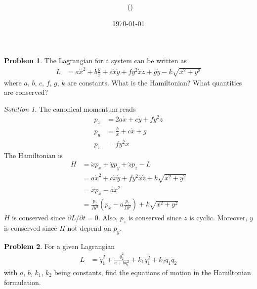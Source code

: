 \documentclass[twoside,11pt]{article}
\title{{\lms \Code \ \Ass}}
\author{\lms \name \ (\href{mailto:\mail}{\mail})}
\date{\sffamily \today}
\makeatletter
\newcommand{\lms}{\fontfamily{lmss}\selectfont} %
\theoremstyle{definition}
\newtheorem{problem}{\lms Problem}
\theoremstyle{remark}
\newtheorem*{solution}{Solution}
\renewcommand{\maketitle}{\bgroup\setlength{\parindent}{0pt}
\begin{flushleft}
  \textbf{\Large\@title}

  \@author
\end{flushleft}\egroup
}
\makeatother
\begin{document}
\maketitle
\thispagestyle{title}

\begin{problem}
The Lagrangian for a system can be written as
\begin{align}
    L &= a\dot x^2 + b \frac{\dot y}{x} + c\dot x\dot y
    + fy^2\dot x\dot z + g\dot y - k\sqrt{x^2 + y^2}
\end{align}
where $a$, $b$, $c$, $f$, $g$, $k$ are constants.
What is the Hamiltonian?
What quantities are conserved?
\end{problem}

\begin{solution}
The canonical momentum reads
\begin{align*}
    p_x &= 2a\dot x + c\dot y + fy^2\dot z\\
    p_y &= \frac{b}{x} + c\dot x + g\\
    p_z &= fy^2 x
\end{align*}
The Hamiltonian is 
\begin{align*}
    H &= \dot xp_x + \dot yp_y + \dot zp_z - L\\
      &= a\dot x^2 + c\dot x\dot y + fy^2\dot x\dot z + k\sqrt{x^2 + y^2}\\
      &= \dot xp_x - a\dot x^2\\
      &= \frac{p_z}{fy^2}\left( 
          p_x - a \frac{p_z}{fy^2}
      \right) + k\sqrt{x^2 + y^2}
\end{align*}
$H$ is conserved since $\partial L/\partial t = 0$.
Also, $p_z$ is conserved since $z$ is cyclic.
Moreover, $y$ is conserved since $H$ not depend on $p_y$.
\end{solution}



\begin{problem}
For a given Lagrangian
\begin{align}
    L &= \dot q_1^2 + \frac{\dot q_2^2}{a + bq_1^2}
    + k_1q_1^2 + k_2\dot q_1\dot q_2
\end{align}
with $a$, $b$, $k_1$, $k_2$ being constants,
find the equations of motion in the Hamiltonian formulation.
\end{problem}
\end{document}
